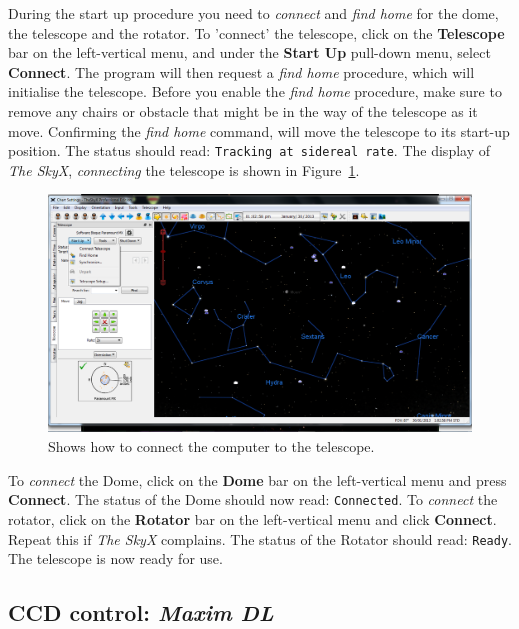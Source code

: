 \documentclass[12pt,twoside,a4paper]{report}
\begin{document}
During the start up procedure you need to \textit{connect} and \textit{find home} for the dome, 
the telescope and the rotator. 
To 'connect' the telescope, click on the \textbf{Telescope} bar on the left-vertical menu, and 
under the \textbf{Start Up} pull-down menu, select \textbf{Connect}. The program will then request 
a \textit{find home} procedure, which will initialise the telescope. Before you enable the 
\textit{find home} procedure, make sure to remove any chairs or obstacle that might be in the
way of the telescope as it move. Confirming the \textit{find home} command, will move the telescope 
to its start-up position. The status should read: {\textcolor{PineGreen}{\tt Tracking at sidereal rate}}.
The display of \emph{The SkyX},  \textit{connecting} the telescope is shown in 
Figure~\ref{fig:connect_telescope}.\\

\begin{figure}[ht]
 \centering
    \includegraphics[width=\textwidth]{documentation_images/connect_telescope.png}
    \caption{\label{fig:connect_telescope} Shows how to connect the computer to the telescope.}
\end{figure}

To \textit{connect} the Dome, click on the \textbf{Dome} bar on the left-vertical menu and press 
\textbf{Connect}. The status of the Dome should now read: \textcolor{PineGreen}{\tt Connected}.
To \textit{connect} the rotator, click on the \textbf{Rotator} bar on the left-vertical menu and 
click \textbf{Connect}. Repeat this if \emph{The SkyX} complains.  The status of the Rotator should 
read: \textcolor{PineGreen}{\tt Ready}. The telescope is now ready for use.

\subsection{CCD control: \emph{Maxim DL}}
\end{document}
